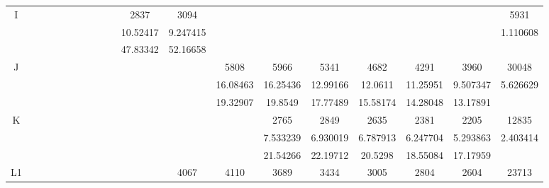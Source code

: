 \begin{table}
{\begin{tabular}{c|cccccccccccccccccc}
\multirow{3}{*}{I}            &          &          &          &          &          &          &          &          &          &        2837&        3094&          &          &          &          &          &          &        5931\\
            &          &          &          &          &          &          &          &          &          &    10.52417&    9.247415&          &          &          &          &          &          &    1.110608\\
            &          &          &          &          &          &          &          &          &          &    47.83342&    52.16658&          &          &          &          &          &          &          \\\midrule
\multirow{3}{*}{J}            &          &          &          &          &          &          &          &          &          &          &          &        5808&        5966&        5341&        4682&        4291&        3960&       30048\\
            &          &          &          &          &          &          &          &          &          &          &          &    16.08463&    16.25436&    12.99166&     12.0611&    11.25951&    9.507347&    5.626629\\
            &          &          &          &          &          &          &          &          &          &          &          &    19.32907&     19.8549&    17.77489&    15.58174&    14.28048&    13.17891&          \\\midrule
\multirow{3}{*}{K}            &          &          &          &          &          &          &          &          &          &          &          &          &        2765&        2849&        2635&        2381&        2205&       12835\\
            &          &          &          &          &          &          &          &          &          &          &          &          &    7.533239&    6.930019&    6.787913&    6.247704&    5.293863&    2.403414\\
            &          &          &          &          &          &          &          &          &          &          &          &          &    21.54266&    22.19712&     20.5298&    18.55084&    17.17959&          \\\midrule
\multirow{3}{*}{L1}            &          &          &          &          &          &          &          &          &          &          &        4067&        4110&        3689&        3434&        3005&        2804&        2604&       23713\\

\end{tabular}}
\end{table}
